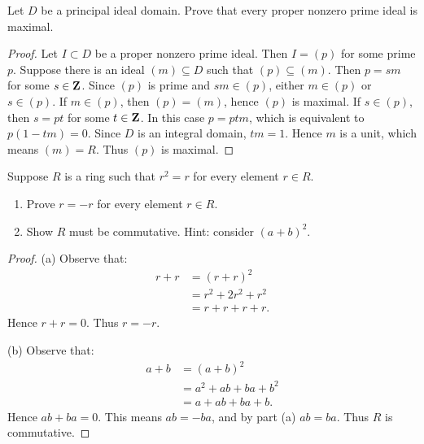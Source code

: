 \documentclass[11pt,twoside,openany]{memoir}
\begin{document}
\begin{problem}[Midterm 2]
Let $D$ be a principal ideal domain. Prove that every proper nonzero prime ideal is maximal.
\end{problem}
    {\color{blue} \begin{proof}
        Let $I \subset D$ be a proper nonzero prime ideal. Then $I = (p)$ for some prime $p$. Suppose there is an ideal $(m) \subseteq D$ such that $(p) \subseteq (m)$. Then $p = sm$ for some $s \in \mathbf{Z}$. Since $(p)$ is prime and $sm \in (p)$, either $m \in (p)$ or $s \in (p)$. If $m \in (p)$, then $(p) = (m)$, hence $(p)$ is maximal. If $s \in (p)$, then $s = pt$ for some $t \in \mathbf{Z}$. In this case $p = ptm$, which is equivalent to $p(1-tm) = 0$. Since $D$ is an integral domain, $tm = 1$. Hence $m$ is a unit, which means $(m) = R$. Thus $(p)$ is maximal.
    \end{proof}}
\newpage
\begin{problem}
Suppose $R$ is a ring such that $r^2 = r$ for every element $r \in R$.
\begin{enumerate}[label = (\alph*),itemsep=1pt,topsep=3pt]
    \item Prove $r = -r$ for every element $r \in R$.
    \item Show $R$ must be commutative. Hint: consider $(a+b)^2$.
\end{enumerate}
\end{problem}
    {\color{blue} \begin{proof}
        (a) Observe that:
            \begin{equation*}
            \begin{split}
                r+r 
                & = (r+r)^2 \\
                & = r^2 + 2r^2 + r^2 \\
                & = r + r + r + r.
            \end{split}
            \end{equation*}
        Hence $r+r = 0$. Thus $r = -r$.

        (b) Observe that:
            \begin{equation*}
            \begin{split}
                a+b
                & = (a+b)^2 \\
                & = a^2 + ab + ba + b^2 \\
                & = a + ab + ba + b.
            \end{split}
            \end{equation*}
        Hence $ab + ba = 0$. This means $ab = -ba$, and by part (a) $ab = ba$. Thus $R$ is commutative.
    \end{proof}}
\end{document}
